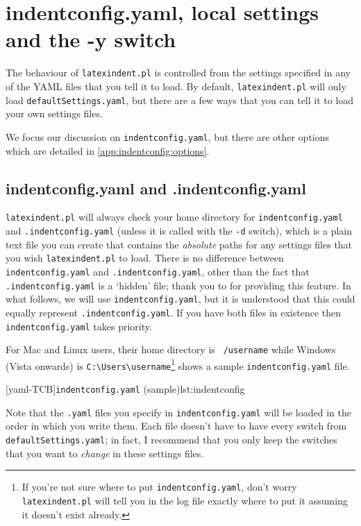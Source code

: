 \section{indentconfig.yaml, local settings and the -y switch }\label{sec:indentconfig}
 The behaviour of \texttt{latexindent.pl} is controlled from the settings specified in
 any of the YAML files that you tell it to load. By default, \texttt{latexindent.pl} will
 only load \texttt{defaultSettings.yaml}, but there are a few ways that you can tell it
 to load your own settings files.

 We focus our discussion on \texttt{indentconfig.yaml}, but there are other options which
 are detailed in \cref{app:indentconfig:options}. 

\subsection{indentconfig.yaml and .indentconfig.yaml}\label{subsec:indentconfig}
 \texttt{latexindent.pl} will always check your home directory for
 \texttt{indentconfig.yaml}
 and \texttt{.indentconfig.yaml} (unless it is called with the \texttt{-d} switch), which
 is a plain text file you can create that contains the \emph{absolute} paths for any
 settings files that you wish \texttt{latexindent.pl} to load. There is no difference
 between \texttt{indentconfig.yaml} and \texttt{.indentconfig.yaml}, other than the fact
 that \texttt{.indentconfig.yaml} is a `hidden' file; thank you to
 \cite{jacobo-diaz-hidden-config} for providing this feature. In what follows, we will use
 \texttt{indentconfig.yaml}, but it is understood that this could equally represent
 \texttt{.indentconfig.yaml}. If you have both files in existence then
 \texttt{indentconfig.yaml} takes priority.

 For Mac and Linux users, their home directory is \texttt{~/username} while Windows
 (Vista onwards) is \lstinline!C:\Users\username!\footnote{If you're not sure where to
 put \texttt{indentconfig.yaml}, don't worry \texttt{latexindent.pl} will tell you in the
 log file exactly where to put it assuming it doesn't exist already.}
  shows a sample \texttt{indentconfig.yaml} file.

 [yaml-TCB]{\texttt{indentconfig.yaml} (sample)}{lst:indentconfig}

 Note that the \texttt{.yaml} files you specify in \texttt{indentconfig.yaml} will be
 loaded in the order in which you write them. Each file doesn't have to have every switch
 from \texttt{defaultSettings.yaml}; in fact, I recommend that you only keep the switches
 that you want to \emph{change} in these settings files.

